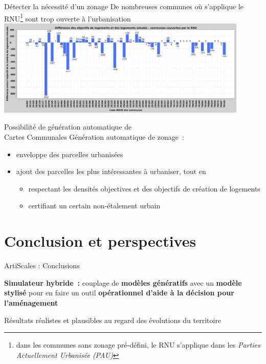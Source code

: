 \documentclass[xcolor=table]{beamer}
\begin{document}
\begin{frame}{Détecter la nécessité d'un zonage}
	De nombreuses communes où s'applique le RNU\footnote{dans les communes sans zonage pré-défini, le RNU s'applique dans les \textit{Parties Actuellement Urbanisée (PAU)}} sont trop ouverte à l'urbanisation
	\vspace{0.3cm}
	\hspace*{-0.5cm}\includegraphics[width=12cm]{cartes/schemaRNU.png}
\end{frame}

\begin{frame}{Possibilité de génération automatique de \\Cartes Communales}
Génération automatique de zonage~:
\begin{itemize}
	\small
	\item<2-> enveloppe des parcelles urbanisées
	\item<3-> ajout des parcelles les plus intéressantes à urbaniser, tout en 
	\begin{itemize}
			\item<4-> respectant les densités objectives et des objectifs de création de logements
			\item<5-> certifiant un certain non-étalement urbain
	\end{itemize} %
\end{itemize}
\end{frame}




\section{Conclusion et perspectives}

\begin{frame}{ArtiScales : Conclusions}
	\begin{block}{}
		\textbf{Simulateur hybride~:} couplage de \textbf{modèles génératifs} avec un \textbf{modèle stylisé} pour en faire un outil \textbf{opérationnel d'aide à la décision pour l'aménagement}
	\end{block}
	\begin{block}{}
		Résultats réalistes et plausibles au regard des évolutions du territoire
	\end{block}
\end{frame}
\end{document}
